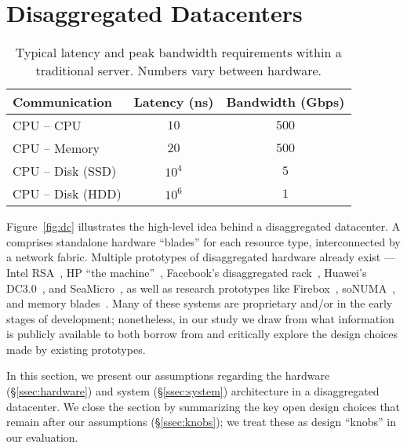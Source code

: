 \section{Disaggregated Datacenters}
\label{sec:summary}


\begin{table}
  \centering
  \small
  \begin{tabular}{l|c|c}
		\textbf{Communication} & \textbf{Latency (ns)} & \textbf{Bandwidth (Gbps)}\\\hline
	\hline
    CPU -- CPU & $10$ & $500$\\\hline
    CPU -- Memory & $20$ & $500$\\\hline
    CPU -- Disk (SSD) & $10^4$ & $5$\\\hline
    CPU -- Disk (HDD) & $10^6$ & $1$\\\hline
    \hline
  \end{tabular}
  \vspace{0.1in}
  \caption{\small{Typical latency and peak bandwidth requirements within a traditional server. Numbers vary between hardware.}}
  \label{tab:tech}
\end{table}

Figure~\ref{fig:dc} illustrates the high-level idea behind a disaggregated datacenter.
A \dis comprises standalone hardware ``blades'' for each resource type,  interconnected by a network fabric.
Multiple prototypes of disaggregated hardware already exist --- Intel RSA~\cite{rsa}, HP ``the machine''~\cite{hptm}, Facebook's disaggregated rack~\cite{fdr}, Huawei's DC3.0~\cite{huawei}, and SeaMicro~\cite{seamicro}, as well as research prototypes like Firebox~\cite{firebox}, soNUMA~\cite{sonuma}, and memory blades~\cite{ddcHwDesign1}. 
Many of these systems are proprietary and/or in the early stages of development; nonetheless, in our study we draw from what information is publicly available to both borrow from and critically explore the design choices made by existing prototypes.

In this section, we present our assumptions regarding the hardware (\S\ref{ssec:hardware}) and system (\S\ref{ssec:system}) architecture in a disaggregated datacenter.
We close the section by summarizing the key open design choices that remain after our assumptions (\S\ref{ssec:knobs}); we treat these as design ``knobs'' in our evaluation.

